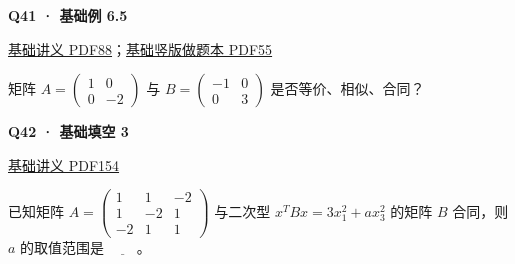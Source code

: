 \documentclass[UTF8,fontset=fandol,11pt,a4paper]{ctexart}
\newcommand{\source}[1]{{\footnotesize\color{Muted}#1\par}}
\newcommand{\qtitle}[2]{\par\needspace{5\baselineskip}\hypertarget{#1}{}\label{#1}\textbf{#2}\par}
\begin{document}
\begin{minipage}{\linewidth}
\qtitle{B-EX-05}{Q41 · 基础例 6.5}
\source{\href{file:///Users/skyintelligence/Desktop/\%E5\%BE\%97\%E8\%AF\%BB\%E4\%B8\%AA\%E7\%A0\%94-\%E5\%8C\%97\%E5\%A4\%A7\%E8\%BD\%AF\%E5\%BE\%AE/\%E6\%95\%B0\%E5\%AD\%A6\%20150/\%E8\%AE\%B2\%E4\%B9\%89/\%E3\%80\%90\%E4\%B8\%80\%E9\%AB\%98\%E6\%95\%B0Kira\%E3\%80\%9127\%E8\%80\%83\%E7\%A0\%94\%E7\%BA\%BF\%E4\%BB\%A3\%E5\%9F\%BA\%E7\%A1\%80\%E8\%AE\%B2\%E4\%B9\%89\%26\%E4\%B9\%A0\%E9\%A2\%98-\%E7\%94\%B5\%E5\%AD\%90\%E7\%89\%88.pdf\#page=88}{基础讲义 PDF88}；\href{file:///Users/skyintelligence/Desktop/\%E5\%BE\%97\%E8\%AF\%BB\%E4\%B8\%AA\%E7\%A0\%94-\%E5\%8C\%97\%E5\%A4\%A7\%E8\%BD\%AF\%E5\%BE\%AE/\%E6\%95\%B0\%E5\%AD\%A6\%20150/\%E8\%AE\%B2\%E4\%B9\%89/\%E3\%80\%90\%E7\%AB\%96\%E7\%89\%88\%E3\%80\%9127\%E8\%80\%83\%E7\%A0\%94Kira\%E7\%BA\%BF\%E4\%BB\%A3\%E5\%9F\%BA\%E7\%A1\%80\%E8\%AE\%B2\%E4\%B9\%89\%E5\%81\%9A\%E9\%A2\%98\%E6\%9C\%AC\%281\%29.pdf\#page=55}{基础竖版做题本 PDF55}}
矩阵 $A=\begin{pmatrix}1&0\\0&-2\end{pmatrix}$ 与 $B=\begin{pmatrix}-1&0\\0&3\end{pmatrix}$ 是否等价、相似、合同？
\end{minipage}\par\vspace{7mm}
\begin{minipage}{\linewidth}
\qtitle{B-FB-03}{Q42 · 基础填空 3}
\source{\href{file:///Users/skyintelligence/Desktop/\%E5\%BE\%97\%E8\%AF\%BB\%E4\%B8\%AA\%E7\%A0\%94-\%E5\%8C\%97\%E5\%A4\%A7\%E8\%BD\%AF\%E5\%BE\%AE/\%E6\%95\%B0\%E5\%AD\%A6\%20150/\%E8\%AE\%B2\%E4\%B9\%89/\%E3\%80\%90\%E4\%B8\%80\%E9\%AB\%98\%E6\%95\%B0Kira\%E3\%80\%9127\%E8\%80\%83\%E7\%A0\%94\%E7\%BA\%BF\%E4\%BB\%A3\%E5\%9F\%BA\%E7\%A1\%80\%E8\%AE\%B2\%E4\%B9\%89\%26\%E4\%B9\%A0\%E9\%A2\%98-\%E7\%94\%B5\%E5\%AD\%90\%E7\%89\%88.pdf\#page=154}{基础讲义 PDF154}}
已知矩阵 $A=\begin{pmatrix}1&1&-2\\1&-2&1\\-2&1&1\end{pmatrix}$ 与二次型 $x^TBx=3x_1^2+ax_3^2$ 的矩阵 $B$ 合同，则 $a$ 的取值范围是 $\underline{\qquad}$。
\end{minipage}\par\vspace{7mm}
\end{document}
